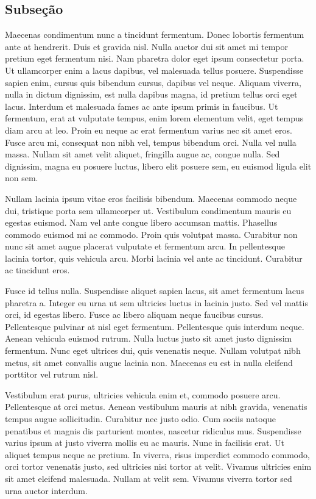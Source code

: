 \subsection{Subse\c{c}\~{a}o}
\label{sec:subsec01}

Maecenas condimentum nunc a tincidunt fermentum. Donec lobortis fermentum ante at hendrerit. Duis et gravida nisl. Nulla auctor dui sit amet mi tempor pretium eget fermentum nisi. Nam pharetra dolor eget ipsum consectetur porta. Ut ullamcorper enim a lacus dapibus, vel malesuada tellus posuere. Suspendisse sapien enim, cursus quis bibendum cursus, dapibus vel neque. Aliquam viverra, nulla in dictum dignissim, est nulla dapibus magna, id pretium tellus orci eget lacus. Interdum et malesuada fames ac ante ipsum primis in faucibus. Ut fermentum, erat at vulputate tempus, enim lorem elementum velit, eget tempus diam arcu at leo. Proin eu neque ac erat fermentum varius nec sit amet eros. Fusce arcu mi, consequat non nibh vel, tempus bibendum orci. Nulla vel nulla massa. Nullam sit amet velit aliquet, fringilla augue ac, congue nulla. Sed dignissim, magna eu posuere luctus, libero elit posuere sem, eu euismod ligula elit non sem.

Nullam lacinia ipsum vitae eros facilisis bibendum. Maecenas commodo neque dui, tristique porta sem ullamcorper ut. Vestibulum condimentum mauris eu egestas euismod. Nam vel ante congue libero accumsan mattis. Phasellus commodo euismod mi ac commodo. Proin quis volutpat massa. Curabitur non nunc sit amet augue placerat vulputate et fermentum arcu. In pellentesque lacinia tortor, quis vehicula arcu. Morbi lacinia vel ante ac tincidunt. Curabitur ac tincidunt eros.

Fusce id tellus nulla. Suspendisse aliquet sapien lacus, sit amet fermentum lacus pharetra a. Integer eu urna ut sem ultricies luctus in lacinia justo. Sed vel mattis orci, id egestas libero. Fusce ac libero aliquam neque faucibus cursus. Pellentesque pulvinar at nisl eget fermentum. Pellentesque quis interdum neque. Aenean vehicula euismod rutrum. Nulla luctus justo sit amet justo dignissim fermentum. Nunc eget ultrices dui, quis venenatis neque. Nullam volutpat nibh metus, sit amet convallis augue lacinia non. Maecenas eu est in nulla eleifend porttitor vel rutrum nisl.

Vestibulum erat purus, ultricies vehicula enim et, commodo posuere arcu. Pellentesque at orci metus. Aenean vestibulum mauris at nibh gravida, venenatis tempus augue sollicitudin. Curabitur nec justo odio. Cum sociis natoque penatibus et magnis dis parturient montes, nascetur ridiculus mus. Suspendisse varius ipsum at justo viverra mollis eu ac mauris. Nunc in facilisis erat. Ut aliquet tempus neque ac pretium. In viverra, risus imperdiet commodo commodo, orci tortor venenatis justo, sed ultricies nisi tortor at velit. Vivamus ultricies enim sit amet eleifend malesuada. Nullam at velit sem. Vivamus viverra tortor sed urna auctor interdum. 